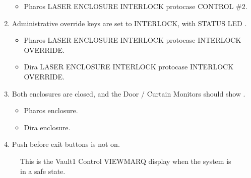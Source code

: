 \documentclass[letterpaper,10pt,english]{sphinxmanual}
\begin{document}
\begin{enumerate}
\begin{itemize}
\item {} 
\sphinxAtStartPar
Pharos LASER ENCLOSURE INTERLOCK protocase CONTROL \#2.

\end{itemize}

\item {} 
\sphinxAtStartPar
Administrative override keys are set to INTERLOCK, with STATUS LED .
\begin{itemize}
\item {} 
\sphinxAtStartPar
Pharos LASER ENCLOSURE INTERLOCK protocase INTERLOCK OVERRIDE.

\item {} 
\sphinxAtStartPar
Dira LASER ENCLOSURE INTERLOCK protocase INTERLOCK OVERRIDE.

\end{itemize}

\item {} 
\sphinxAtStartPar
Both enclosures are closed, and the Door / Curtain Monitors should show .
\begin{itemize}
\item {} 
\sphinxAtStartPar
Pharos enclosure.

\item {} 
\sphinxAtStartPar
Dira enclosure.

\end{itemize}

\item {} 
\sphinxAtStartPar
Push before exit buttons is not on.

\end{enumerate}

\begin{figure}[htbp]
\centering
\capstart

\noindent{}
\caption{ This is the Vault\sphinxhyphen{}1 Control VIEWMARQ display when the system is in a safe state.}\label{\detokenize{testing_documentation/Vault-1_laser:id1}}\end{figure}
\end{document}
